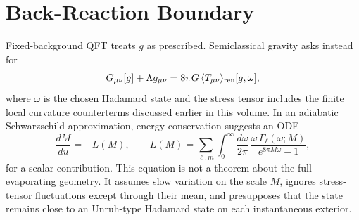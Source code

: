 \section{Back-Reaction Boundary}

Fixed-background QFT treats \(g\) as prescribed.  Semiclassical gravity asks
instead for
\[
  G_{\mu\nu}[g]+\Lambda g_{\mu\nu}
  =
  8\pi G\,\langle T_{\mu\nu}\rangle_{\rm ren}[g,\omega],
\]
where \(\omega\) is the chosen Hadamard state and the stress tensor includes
the finite local curvature counterterms discussed earlier in this volume.  In
an adiabatic Schwarzschild approximation, energy conservation suggests an
ODE
\[
  \frac{dM}{du}=-L(M),
  \qquad
  L(M)=
  \sum_{\ell,m}
  \int_0^\infty
  \frac{d\omega}{2\pi}\,
  \frac{\omega\,\Gamma_\ell(\omega;M)}
       {e^{8\pi M\omega}-1},
\]
for a scalar contribution.  This equation is not a theorem about the full
evaporating geometry.  It assumes slow variation on the scale \(M\), ignores
stress-tensor fluctuations except through their mean, and presupposes that
the state remains close to an Unruh-type Hadamard state on each instantaneous
exterior.

